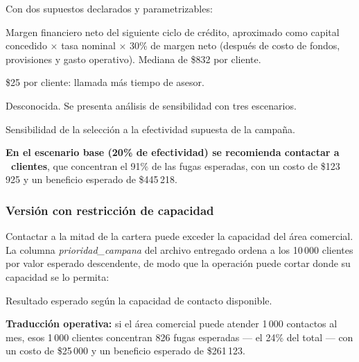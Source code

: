 \documentclass[11pt,a4paper]{article}
\newcommand{\T}[1]{}
\begin{document}
\noindent Con dos supuestos declarados y parametrizables:

\begin{description}[leftmargin=1.4em,style=nextline,nosep]
\item[Valor del cliente] Margen financiero neto del siguiente ciclo de crédito,
      aproximado como capital concedido $\times$ tasa nominal $\times$ 30\% de
      margen neto (después de costo de fondos, provisiones y gasto operativo).
      Mediana de \$832 por cliente.
\item[Costo de contacto] \$25 por cliente: llamada más tiempo de asesor.
\item[Efectividad de campaña] Desconocida. Se presenta análisis de sensibilidad
      con tres escenarios.
\end{description}

\begin{table}[H]\centering\small
\caption{Sensibilidad de la selección a la efectividad supuesta de la campaña.}
\T{sensibilidad}
\end{table}

\noindent \textbf{En el escenario base (20\% de efectividad) se recomienda
contactar a \NCampana\ clientes}, que concentran el 91\% de las fugas esperadas,
con un costo de \$123\,925 y un beneficio esperado de \$445\,218.

\subsubsection*{Versión con restricción de capacidad}

Contactar a la mitad de la cartera puede exceder la capacidad del área comercial.
La columna \emph{prioridad\_campana} del archivo entregado ordena a los 10\,000
clientes por valor esperado descendente, de modo que la operación puede cortar
donde su capacidad se lo permita:

\begin{table}[H]\centering\small
\caption{Resultado esperado según la capacidad de contacto disponible.}
\T{capacidad}
\end{table}

\begin{nota}
\small \textbf{Traducción operativa:} si el área comercial puede atender 1\,000
contactos al mes, esos 1\,000 clientes concentran 826 fugas esperadas --- el 24\%
del total --- con un costo de \$25\,000 y un beneficio esperado de \$261\,123.
\end{nota}
\end{document}
